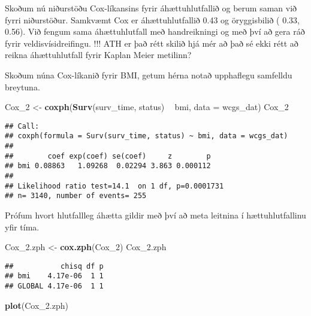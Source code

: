 \documentclass[
]{book}
\newenvironment{Shaded}{\begin{snugshade}}{\end{snugshade}}
\newcommand{\DataTypeTok}[1]{\textcolor[rgb]{0.13,0.29,0.53}{#1}}
\newcommand{\DecValTok}[1]{\textcolor[rgb]{0.00,0.00,0.81}{#1}}
\newcommand{\FloatTok}[1]{\textcolor[rgb]{0.00,0.00,0.81}{#1}}
\newcommand{\KeywordTok}[1]{\textcolor[rgb]{0.13,0.29,0.53}{\textbf{#1}}}
\newcommand{\NormalTok}[1]{#1}
\newcommand{\OperatorTok}[1]{\textcolor[rgb]{0.81,0.36,0.00}{\textbf{#1}}}
\newcommand{\StringTok}[1]{\textcolor[rgb]{0.31,0.60,0.02}{#1}}
\begin{document}
Skoðum nú niðurstöðu Cox-líkansins fyrir áhættuhlutfallið og berum saman við fyrri niðurstöður. Samkvæmt Cox er áhættuhlutfallið 0.43 og öryggisbilið ( 0.33, 0.56). Við fengum sama áhættuhlutfall með handreikningi og með því að gera ráð fyrir veldisvísidreifingu. !!! ATH er það rétt skilið hjá mér að það sé ekki rétt að reikna áhættuhlutfall fyrir Kaplan Meier metilinn?

Skoðum núna Cox-líkanið fyrir BMI, getum hérna notað upphaflegu samfelldu breytuna.

\begin{Shaded}
\begin{Highlighting}[]
\NormalTok{Cox_}\DecValTok{2}\NormalTok{ <-}\StringTok{ }\KeywordTok{coxph}\NormalTok{(}\KeywordTok{Surv}\NormalTok{(surv_time, status) }\OperatorTok{~}\StringTok{ }\NormalTok{bmi, }\DataTypeTok{data =}\NormalTok{ wcgs_dat)}
\NormalTok{Cox_}\DecValTok{2}
\end{Highlighting}
\end{Shaded}

\begin{verbatim}
## Call:
## coxph(formula = Surv(surv_time, status) ~ bmi, data = wcgs_dat)
## 
##        coef exp(coef) se(coef)     z        p
## bmi 0.08863   1.09268  0.02294 3.863 0.000112
## 
## Likelihood ratio test=14.1  on 1 df, p=0.0001731
## n= 3140, number of events= 255
\end{verbatim}

Prófum hvort hlutfallleg áhætta gildir með því að meta leitnina í hættuhlutfallinu yfir tíma.

\begin{Shaded}
\begin{Highlighting}[]
\NormalTok{Cox_}\FloatTok{2.}\NormalTok{zph <-}\StringTok{ }\KeywordTok{cox.zph}\NormalTok{(Cox_}\DecValTok{2}\NormalTok{)}
\NormalTok{Cox_}\FloatTok{2.}\NormalTok{zph}
\end{Highlighting}
\end{Shaded}

\begin{verbatim}
##           chisq df p
## bmi    4.17e-06  1 1
## GLOBAL 4.17e-06  1 1
\end{verbatim}

\begin{Shaded}
\begin{Highlighting}[]
\KeywordTok{plot}\NormalTok{(Cox_}\FloatTok{2.}\NormalTok{zph)}
\end{Highlighting}
\end{Shaded}
\end{document}
